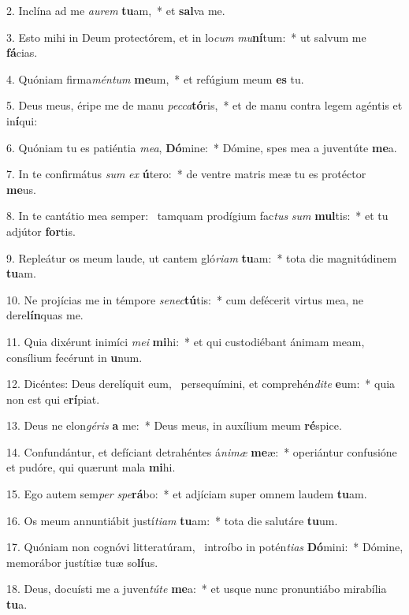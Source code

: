 2. Inclína ad me \textit{au}\textit{rem} \textbf{tu}am,~*  et \textbf{sal}va me.\

3. Esto mihi in Deum protectórem, et in lo\textit{cum} \textit{mu}\textbf{ní}tum:~*  ut salvum me \textbf{fá}cias.\

4. Quóniam firma\textit{mén}\textit{tum} \textbf{me}um,~*  et refúgium meum \textbf{es} tu.\

5. Deus meus, éripe me de manu \textit{pec}\textit{ca}\textbf{tó}ris,~*  et de manu contra legem agéntis et in\textbf{í}qui:\

6. Quóniam tu es patiéntia \textit{me}\textit{a}, \textbf{Dó}mine:~*  Dómine, spes mea a juventúte \textbf{me}a.\

7. In te confirmátus \textit{sum} \textit{ex} \textbf{ú}tero:~*  de ventre matris meæ tu es protéctor \textbf{me}us.\

8. In te cantátio mea semper: \dag\  tamquam prodígium fac\textit{tus} \textit{sum} \textbf{mul}tis:~*  et tu adjútor \textbf{for}tis.\

9. Repleátur os meum laude, ut cantem gló\textit{ri}\textit{am} \textbf{tu}am:~*  tota die magnitúdinem \textbf{tu}am.\

10. Ne projícias me in témpore \textit{se}\textit{nec}\textbf{tú}tis:~*  cum defécerit virtus mea, ne dere\textbf{lín}quas me.\

11. Quia dixérunt inimíci \textit{me}\textit{i} \textbf{mi}hi:~*  et qui custodiébant ánimam meam, consílium fecérunt in \textbf{u}num.\

12. Dicéntes: Deus derelíquit eum, \dag\  persequímini, et comprehén\textit{di}\textit{te} \textbf{e}um:~*  quia non est qui e\textbf{rí}piat.\

13. Deus ne elon\textit{gé}\textit{ris} \textbf{a} me:~*  Deus meus, in auxílium meum \textbf{ré}spice.\

14. Confundántur, et defíciant detrahéntes á\textit{ni}\textit{mæ} \textbf{me}æ:~*  operiántur confusióne et pudóre, qui quærunt mala \textbf{mi}hi.\

15. Ego autem sem\textit{per} \textit{spe}\textbf{rá}bo:~*  et adjíciam super omnem laudem \textbf{tu}am.\

16. Os meum annuntiábit justí\textit{ti}\textit{am} \textbf{tu}am:~*  tota die salutáre \textbf{tu}um.\

17. Quóniam non cognóvi litteratúram, \dag\  introíbo in potén\textit{ti}\textit{as} \textbf{Dó}mini:~*  Dómine, memorábor justítiæ tuæ so\textbf{lí}us.\

18. Deus, docuísti me a juven\textit{tú}\textit{te} \textbf{me}a:~*  et usque nunc pronuntiábo mirabília \textbf{tu}a.\

